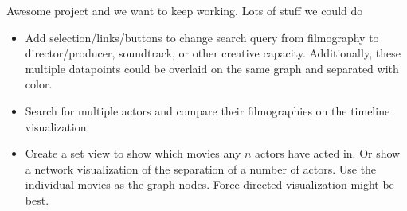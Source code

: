 \documentclass[12pt]{article}
\begin{document}
Awesome project and we want to keep working.  Lots of stuff we could do

\begin{itemize}
	\item Add selection/links/buttons to change search query from filmography to director/producer, soundtrack, or other creative capacity.  Additionally, these multiple datapoints could be overlaid on the same graph and separated with color.
	\item Search for multiple actors and compare their filmographies on the timeline visualization.
	\item Create a set view to show which movies any $n$ actors have acted in.  Or show a network visualization of the separation of a number of actors.  Use the individual movies as the graph nodes.  Force directed visualization might be best.
\end{itemize}
\end{document}
